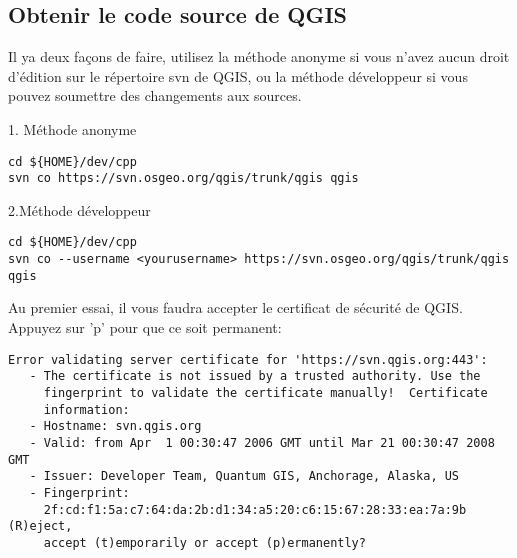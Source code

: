 \subsection{Obtenir le code source de QGIS}
Il ya deux fa\c{c}ons de faire, utilisez la m\'ethode anonyme si vous n'avez aucun droit d'\'edition sur le r\'epertoire svn de QGIS, ou la m\'ethode d\'eveloppeur si vous pouvez soumettre des changements aux sources.

1. M\'ethode anonyme

\begin{verbatim}
cd ${HOME}/dev/cpp 
svn co https://svn.osgeo.org/qgis/trunk/qgis qgis
\end{verbatim}

2.M\'ethode d\'eveloppeur

\begin{verbatim}
cd ${HOME}/dev/cpp 
svn co --username <yourusername> https://svn.osgeo.org/qgis/trunk/qgis qgis 
\end{verbatim}

Au premier essai, il vous faudra accepter le certificat de s\'ecurit\'e de QGIS. Appuyez sur 'p' pour que ce soit permanent:

\begin{verbatim}
Error validating server certificate for 'https://svn.qgis.org:443':
   - The certificate is not issued by a trusted authority. Use the
     fingerprint to validate the certificate manually!  Certificate
     information:
   - Hostname: svn.qgis.org
   - Valid: from Apr  1 00:30:47 2006 GMT until Mar 21 00:30:47 2008 GMT
   - Issuer: Developer Team, Quantum GIS, Anchorage, Alaska, US
   - Fingerprint:
     2f:cd:f1:5a:c7:64:da:2b:d1:34:a5:20:c6:15:67:28:33:ea:7a:9b (R)eject,
     accept (t)emporarily or accept (p)ermanently?  
\end{verbatim}

